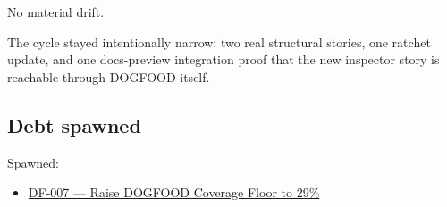 No material drift.

The cycle stayed intentionally narrow: two real structural stories, one ratchet update, and one docs-preview integration proof that the new inspector story is reachable through DOGFOOD itself.

\subsection{Debt spawned}\label{record-068-debt-spawned}

Spawned:

\begin{itemize}
\tightlist
\item
  \href{https://github.com/flyingrobots/bijou/blob/cbd70612140e7a450d764b3c7be1c6af878b99bc/docs/design/DF-007-raise-dogfood-coverage-floor-to-29-percent.md}{DF-007 --- Raise DOGFOOD Coverage Floor to 29\%}
\end{itemize}

